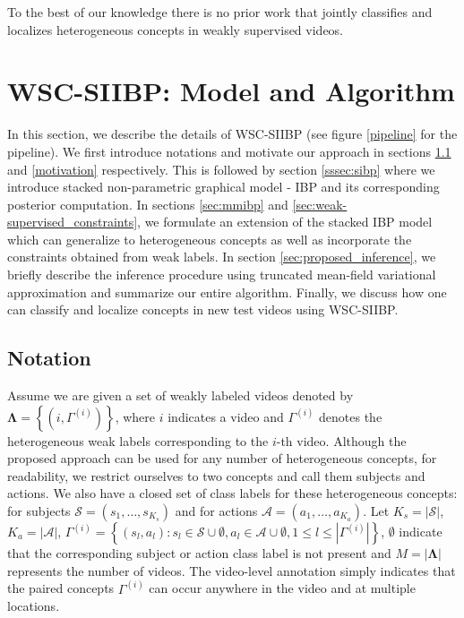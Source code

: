 \documentclass[runningheads]{llncs}
\begin{document}
To the best of our knowledge there is no prior work that jointly classifies and localizes heterogeneous concepts in weakly supervised videos.

\section{WSC-SIIBP: Model and Algorithm}

In this section, we describe the details of WSC-SIIBP (see figure \ref{pipeline} for the pipeline). We first introduce notations and motivate our approach in sections \ref{problem_formulation} and \ref{motivation} respectively. This is followed by section \ref{sssec:sibp} where we introduce stacked non-parametric graphical model - IBP and its corresponding posterior computation. In sections \ref{sec:mmibp} and \ref{sec:weak-supervised_constraints}, we formulate an extension of the stacked IBP model which can generalize to heterogeneous concepts as well as incorporate the constraints obtained from weak labels. In section \ref{sec:proposed_inference}, we briefly describe the inference procedure using truncated mean-field variational approximation and summarize our entire algorithm. 
Finally, we discuss how one can classify and localize concepts in new test videos using WSC-SIIBP.

\subsection{Notation}
\label{problem_formulation}

Assume we are given a set of weakly labeled videos denoted by  $\mathbf{\Lambda} = \left\lbrace(i, \Gamma^{(i)})\right\rbrace$, where $i$ indicates a video and $\Gamma^{(i)}$ denotes the heterogeneous weak labels corresponding to the $i$-th video. Although the proposed approach can be used for any number of heterogeneous concepts, for readability, we restrict ourselves to two concepts and call them subjects and actions. We also have a closed set of class labels for these heterogeneous concepts: for subjects $\mathcal{S} = (s_1,\dots,s_{K_s})$ and for actions $\mathcal{A} = (a_1,\dots,a_{K_a})$. Let $K_s = |\mathcal{S}|$, $K_a = |\mathcal{A}|$, $\Gamma^{(i)} = \left\lbrace(s_l,a_l): s_l\in\mathcal{S} \cup \emptyset , a_l \in\mathcal{A} \cup \emptyset , 1\leq l \leq |\Gamma^{(i)}|\right\rbrace$, $\emptyset$ indicate that the corresponding subject or action class label is not present and $M = |\mathbf{\Lambda}|$ represents the number of videos. The video-level annotation simply indicates that the paired concepts $\Gamma^{(i)}$ can occur anywhere in the video and at multiple locations.
\end{document}

